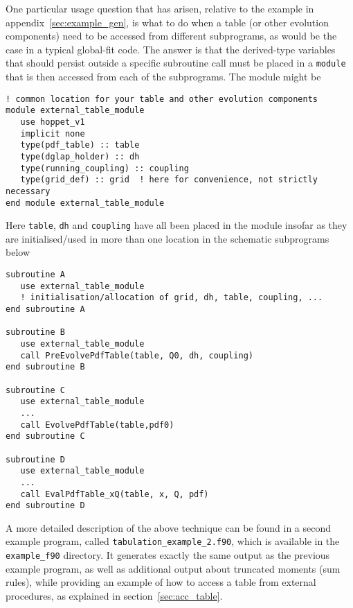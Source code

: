 \documentclass[12pt]{article}
\newcommand{\ttt}[1]{\texttt{#1}}
\begin{document}
One particular usage question that has arisen, relative to the example
in appendix~\ref{sec:example_gen}, is what to do when a table (or
other evolution components) need to be accessed from different
subprograms, as would be the case in a typical global-fit code.  The
answer is that the derived-type variables that should persist outside
a specific subroutine call must be placed in a \ttt{module} that is
then accessed from each of the subprograms. The module might be
\begin{lstlisting}
! common location for your table and other evolution components
module external_table_module 
   use hoppet_v1
   implicit none
   type(pdf_table) :: table
   type(dglap_holder) :: dh
   type(running_coupling) :: coupling
   type(grid_def) :: grid  ! here for convenience, not strictly necessary
end module external_table_module
\end{lstlisting}
Here \texttt{table}, \texttt{dh} and \ttt{coupling} have all been
placed in the module insofar as they are initialised/used in more than
one location in the schematic subprograms below
\begin{lstlisting}
subroutine A
   use external_table_module
   ! initialisation/allocation of grid, dh, table, coupling, ...
end subroutine A

subroutine B
   use external_table_module
   call PreEvolvePdfTable(table, Q0, dh, coupling)
end subroutine B

subroutine C
   use external_table_module
   ...
   call EvolvePdfTable(table,pdf0)
end subroutine C

subroutine D
   use external_table_module
   ...
   call EvalPdfTable_xQ(table, x, Q, pdf)
end subroutine D

\end{lstlisting}
%
A more detailed description of the above technique 
can be found in a 
second example program, called \ttt{tabulation\_example\_2.f90},
which is available in the \ttt{example\_f90} 
directory. It generates exactly
the same output as the previous example program, as well as additional
output about truncated moments (sum rules), while
providing an example of how to access a table from
external procedures, as explained in section~\ref{sec:acc_table}.






\end{document}
